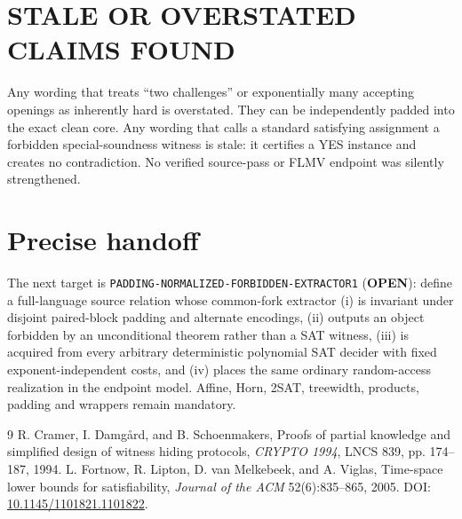 \documentclass[11pt]{article}
\begin{document}
\section{STALE OR OVERSTATED CLAIMS FOUND}

Any wording that treats ``two challenges'' or exponentially many accepting
openings as inherently hard is overstated.  They can be independently padded
into the exact clean core.  Any wording that calls a standard satisfying
assignment a forbidden special-soundness witness is stale: it certifies a YES
instance and creates no contradiction.  No verified source-pass or FLMV
endpoint was silently strengthened.

\section{Precise handoff}

The next target is \texttt{PADDING-NORMALIZED-FORBIDDEN-EXTRACTOR1}
(\textbf{OPEN}): define a full-language source relation whose common-fork
extractor (i) is invariant under disjoint paired-block padding and alternate
encodings, (ii) outputs an object forbidden by an unconditional theorem rather
than a SAT witness, (iii) is acquired from every arbitrary deterministic
polynomial SAT decider with fixed exponent-independent costs, and (iv) places
the same ordinary random-access realization in the endpoint model.  Affine,
Horn, 2SAT, treewidth, products, padding and wrappers remain mandatory.

\begin{thebibliography}{9}
R. Cramer, I. Damg\aa rd, and B. Schoenmakers,
Proofs of partial knowledge and simplified design of witness hiding protocols,
\emph{CRYPTO 1994}, LNCS 839, pp. 174--187, 1994.
L. Fortnow, R. Lipton, D. van Melkebeek, and A. Viglas,
Time-space lower bounds for satisfiability,
\emph{Journal of the ACM} 52(6):835--865, 2005.
DOI: \href{https://doi.org/10.1145/1101821.1101822}{10.1145/1101821.1101822}.
\end{thebibliography}
\end{document}

